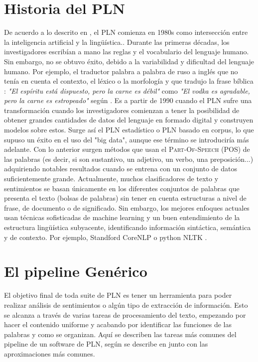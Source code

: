 \section{Historia del PLN}
De acuerdo a lo descrito en \citet{hirschberg2015advances}, el PLN comienza en 1980s como intersección entre la inteligencia artificial y la lingüística..  
Durante las primeras décadas, los investigadores escribían a mano las reglas y el vocabulario del lenguaje humano. Sin embargo, no se obtuvo éxito, debido a la variabilidad y dificultad del lenguaje humano. Por ejemplo, el traductor palabra a palabra de ruso a inglés que no tenía en cuenta el contexto, el léxico o la morfología y que tradujo la frase bíblica : \textsl{"El espíritu está dispuesto, pero la carne es débil"} como \textsl{"El vodka es agradable, pero la carne es
estropeado"} según \citet{nadkarni2011natural}. \newline
Es a partir de 1990 cuando el PLN sufre una transformación cuando los investigadores comienzan a tener la posibilidad de obtener grandes cantidades de datos del lenguaje en formado digital y construyen modelos sobre estos. Surge así el PLN estadístico o PLN basado en corpus, lo que supuso un éxito en el uso del "big data", aunque ese término se introduciría más adelante. Con lo anterior surgen métodos que usan el \textsc{Part-Of-Speech} (POS) de las palabras (es decir, si son sustantivo, un adjetivo, un verbo, una preposición...) adquiriendo notables resultados cuando se entrena con un conjunto de datos suficientemente grande. \newline
Actualmente, muchos clasificadores de texto y sentimientos se basan únicamente en los diferentes conjuntos de palabras que presenta el texto (bolsas de palabras) sin tener en cuenta estructuras a nivel de frase, de documento o de significado. Sin embargo, los mejores enfoques actuales usan técnicas sofisticadas de machine learning y un buen entendimiento de la estructura lingüística subyacente, identificando información sintáctica, semántica y de contexto. Por ejemplo, Standford CoreNLP \citet{manning2014stanford} o python NLTK \citet{bird2006nltk}. 

\section{El pipeline Genérico}
El objetivo final de toda suite de PLN es tener un herramienta para poder realizar análisis de sentimientos o algún tipo de extracción de información. Esto se alcanza a través de varias tareas de procesamiento del texto, empezando por hacer el contenido uniforme y acabando por identificar las funciones de las palabras y como se organizan. Aquí se describen las tareas más comunes del pipeline de un software de PLN, según se describe en \citet{9783319155623} junto con las aproximaciones más comunes. \newline
